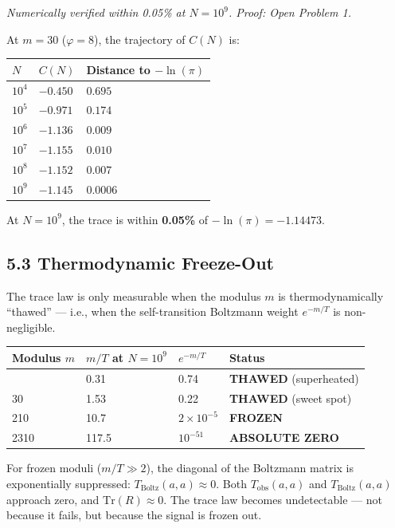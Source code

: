 \documentclass[
  11pt,
]{article}
\newcounter{none} %
\numberwithin{equation}{section}
\begin{document}
\emph{Numerically verified within 0.05\% at \(N = 10^9\). Proof: Open
Problem 1.}

At \(m = 30\) (\(\varphi = 8\)), the trajectory of \(C(N)\) is:

{\def\LTcaptype{none} %
\begin{longtable}[]{@{}lll@{}}
\toprule\noalign{}
\(N\) & \(C(N)\) & Distance to \(-\ln(\pi)\) \\
\midrule\noalign{}
\endhead
\bottomrule\noalign{}
\endlastfoot
\(10^4\) & \(-0.450\) & \(0.695\) \\
\(10^5\) & \(-0.971\) & \(0.174\) \\
\(10^6\) & \(-1.136\) & \(0.009\) \\
\(10^7\) & \(-1.155\) & \(0.010\) \\
\(10^8\) & \(-1.152\) & \(0.007\) \\
\(10^9\) & \(-1.145\) & \(0.0006\) \\
\end{longtable}
}

At \(N = 10^9\), the trace is within \textbf{0.05\%} of
\(-\ln(\pi) = -1.14473\).

\subsection{5.3 Thermodynamic
Freeze-Out}\label{thermodynamic-freeze-out}

The trace law is only measurable when the modulus \(m\) is
thermodynamically ``thawed'' --- i.e., when the self-transition
Boltzmann weight \(e^{-m/T}\) is non-negligible.

{\def\LTcaptype{none} %
\begin{longtable}[]{@{}llll@{}}
\toprule\noalign{}
Modulus \(m\) & \(m/T\) at \(N = 10^9\) & \(e^{-m/T}\) & Status \\
\midrule\noalign{}
\endhead
\bottomrule\noalign{}
\endlastfoot
6 & 0.31 & 0.74 & \textbf{THAWED} (superheated) \\
30 & 1.53 & 0.22 & \textbf{THAWED} (sweet spot) \\
210 & 10.7 & \(2 \times 10^{-5}\) & \textbf{FROZEN} \\
2310 & 117.5 & \(10^{-51}\) & \textbf{ABSOLUTE ZERO} \\
\end{longtable}
}

For frozen moduli (\(m/T \gg 2\)), the diagonal of the Boltzmann matrix
is exponentially suppressed: \(T_{\text{Boltz}}(a,a) \approx 0\). Both
\(T_{\text{obs}}(a,a)\) and \(T_{\text{Boltz}}(a,a)\) approach zero, and
\(\text{Tr}(R) \approx 0\). The trace law becomes undetectable --- not
because it fails, but because the signal is frozen out.
\end{document}
